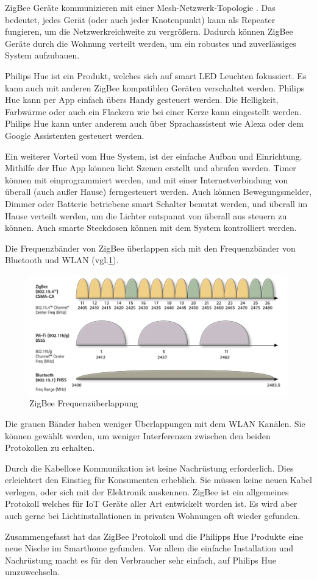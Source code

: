 ZigBee Geräte kommunizieren mit einer Mesh-Netzwerk-Topologie \cite[p.10]{GettingStartedWithZigBee}. Das bedeutet, jedes Gerät (oder auch jeder Knotenpunkt) kann als Repeater fungieren, um die Netzwerkreichweite zu vergrößern. Dadurch können ZigBee Geräte durch die Wohnung verteilt werden, um ein robustes und zuverlässiges System aufzubauen.

Philips Hue ist ein Produkt, welches sich auf smart LED Leuchten fokussiert. Es kann auch mit anderen ZigBee kompatiblen Geräten verschaltet werden. Philips Hue kann per App einfach übers Handy gesteuert werden. Die Helligkeit, Farbwärme oder auch ein Flackern wie bei einer Kerze kann eingestellt werden. Philips Hue kann unter anderem auch über Sprachassistent wie Alexa oder dem Google Assistenten gesteuert werden.

Ein weiterer Vorteil vom Hue System, ist der einfache Aufbau und Einrichtung. Mithilfe der Hue App können licht Szenen erstellt und abrufen werden. Timer können mit einprogrammiert werden, und mit einer Internetverbindung von überall (auch außer Hause) ferngesteuert werden. Auch können Bewegungsmelder, Dimmer oder Batterie betriebene smart Schalter benutzt werden, und überall im Hause verteilt werden, um die Lichter entspannt von überall aus steuern zu können. Auch smarte Steckdosen können mit dem System kontrolliert werden. 

Die Frequenzbänder von ZigBee überlappen sich mit den Frequenzbänder von Bluetooth und WLAN (vgl.\ref{fig:ZigBee_Frequency_bands}).
\begin{figure}[H]
	\centering
	\includegraphics[width=.8\linewidth]{Pictures/ZigBeeRfOverlap}
	\caption{ZigBee Frequenzüberlappung \cite[p.23]{GettingStartedWithZigBee}}
	\label{fig:ZigBee_Frequency_bands}
\end{figure}
Die grauen Bänder haben weniger Überlappungen mit dem WLAN Kanälen. Sie können gewählt werden, um weniger Interferenzen zwischen den beiden Protokollen zu erhalten.

Durch die Kabellose Kommunikation ist keine Nachrüstung erforderlich. Dies erleichtert den Einstieg für Konsumenten erheblich. Sie müssen keine neuen Kabel verlegen, oder sich mit der Elektronik auskennen. ZigBee ist ein allgemeines Protokoll welches für IoT Geräte aller Art entwickelt worden ist. Es wird aber auch gerne bei Lichtinstallationen in privaten Wohnungen oft wieder gefunden.

Zusammengefasst hat das ZigBee Protokoll und die Philipps Hue Produkte eine neue Nische im Smarthome gefunden. Vor allem die einfache Installation und Nachrüstung macht es für den Verbraucher sehr einfach, auf Philips Hue umzuwechseln.



